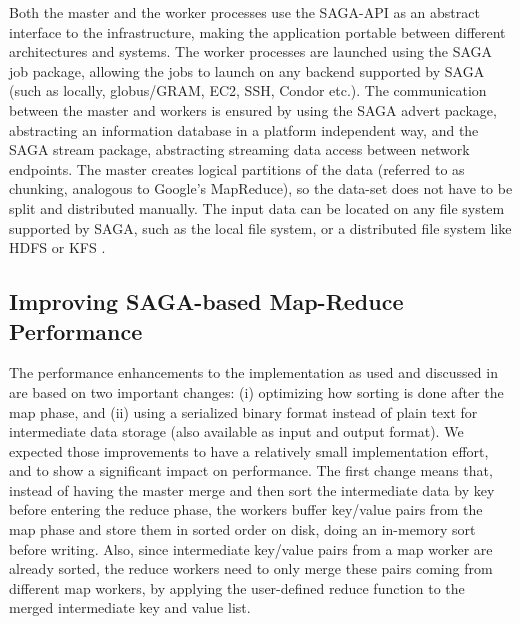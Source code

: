 \documentclass[3p,twocolumn]{elsarticle}
\begin{document}
Both the master and the worker processes use the SAGA-API as an
abstract interface to the  infrastructure, making the application
portable between different architectures and systems.  The worker
processes are launched using the SAGA job package, allowing the jobs
to launch on any backend supported by SAGA (such as locally, globus/GRAM, 
EC2, SSH, Condor etc.).  The communication between the master and workers
is ensured by using the SAGA advert package, abstracting an
information database in a platform independent way, and the SAGA stream
package, abstracting streaming data access between network endpoints.
The master creates logical partitions of the data (referred to as chunking,
analogous to Google's MapReduce), so the data-set does not have to be split
and distributed manually.  The input data can be located on any file system
supported by SAGA, such as the local file system, or a distributed file system
like HDFS or KFS \cite{KFS}.


\subsection{Improving SAGA-based Map-Reduce Performance}


The performance enhancements to the \sagamapreduce implementation as
used and discussed in~\cite{saga_ccgrid09} are based on two important
changes: (i) optimizing how sorting is done after the map phase,
and (ii) using a serialized binary format instead
of plain text for intermediate data storage (also available as
input and output format). We expected those improvements to have
a relatively small implementation effort, and to show a significant 
impact on performance.  The first change means that,
instead of having the master merge and then sort the intermediate data
by key before entering the reduce phase, the workers buffer key/value
pairs from the map phase and store them in sorted order on disk, doing
an in-memory sort before writing. Also, since intermediate key/value
pairs from a map worker are already sorted, the reduce workers need to
only merge these pairs coming from different map workers, by
applying the user-defined reduce function to the merged intermediate
key and value list. 
\end{document}
